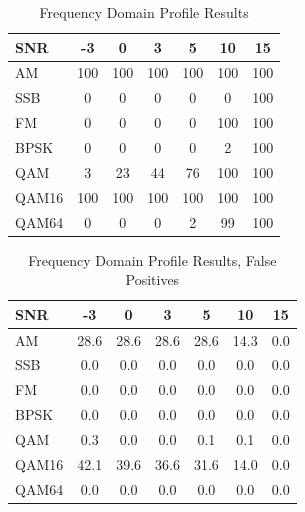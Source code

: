 \begin{table}
\caption{Frequency Domain Profile Results}
\centering
\begin{tabular}{ l | c | c | c | c | c | c } \hline
SNR   &	 -3 &	 0 &	 3 &	 5 &	 10 &	 15\\ \hline \hline 
AM    &	 100 &	 100 &	 100 &	 100 &	 100 &	 100 \\ \hline 
 SSB   &	 0 &	 0 &	 0 &	 0 &	 0 &	 100 \\ \hline 
FM    &	 0 &	 0 &	 0 &	 0 &	 100 &	 100 \\ \hline 
BPSK  &	 0 &	 0 &	 0 &	 0 &	 2 &	 100 \\ \hline 
QAM   &	 3 &	 23 &	 44 &	 76 &	 100 &	 100 \\ \hline 
QAM16 &	 100 &	 100 &	 100 &	 100 &	 100 &	 100 \\ \hline 
QAM64 &	 0 &	 0 &	 0 &	 2 &	 99 &	 100 \\ \hline 
\end{tabular}
\label{tab:CycloHits}
\end{table}

\begin{table}
\caption{Frequency Domain Profile Results, False Positives}
\centering
\begin{tabular}{ l | c | c | c | c | c | c } \hline
SNR   &	 -3 &	 0 &	 3 &	 5 &	 10 &	 15\\ \hline \hline 
AM &	 28.6 &	 28.6 &	 28.6 &	 28.6 &	 14.3 &	 0.0 \\ \hline 
 SSB &	 0.0 &	 0.0 &	 0.0 &	 0.0 &	 0.0 &	 0.0 \\ \hline 
FM &	 0.0 &	 0.0 &	 0.0 &	 0.0 &	 0.0 &	 0.0  \\ \hline 
BPSK &	 0.0 &	 0.0 &	 0.0 &	 0.0 &	 0.0 &	 0.0 \\ \hline 
QAM &	 0.3 &	 0.0 &	 0.0 &	 0.1 &	 0.1 &	 0.0 \\ \hline 
QAM16 &	 42.1 &	 39.6 &	 36.6 &	 31.6 &	 14.0 &	 0.0 \\ \hline 
QAM64 &	 0.0 &	 0.0 &	 0.0 &	 0.0 &	 0.0 &	 0.0 \\ \hline
\end{tabular}
\label{tab:CycloFalsePos}
\end{table}
